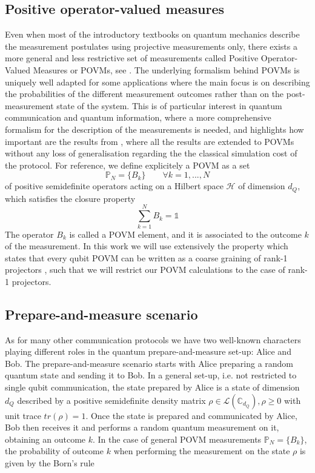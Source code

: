 \subsection{Positive operator-valued measures}\label{section:povms}
Even when most of the introductory textbooks on quantum mechanics describe the measurement postulates using projective measurements only, there exists a more general and less restrictive set of measurements called Positive Operator-Valued Measures or POVMs, see \cite{nielsen2000}\cite{peres1995}. The underlying formalism behind POVMs is uniquely well adapted for some applications where the main focus is on describing the probabilities of the different measurement outcomes rather than on the post-measurement state of the system. This is of particular interest in quantum communication and quantum information, where a more comprehensive formalism for the description of the measurements is needed, and highlights how important are the results from \cite{renner2023}, where all the results are extended to POVMs without any loss of generalisation regarding the the classical simulation cost of the protocol. For reference, we define explicitely a POVM as a set
\begin{equation}\label{eq:povm_!}
\mathbb{P}_N=\{B_{k}\}\qquad\forall k=1,...,N
\end{equation}
of positive semidefinite operators acting on a Hilbert space $\mathcal{H}$ of dimension $d_{Q}$, which satisfies the closure property
\begin{equation}\label{eq:povm_2}
\sum_{k=1}^{N} B_{k} = \mathbb{1}
\end{equation}
The operator $B_{k}$ is called a POVM element, and it is associated to the outcome $k$ of the measurement. In this work we will use extensively the property which states that every qubit POVM can be written as a coarse graining of rank-1 projectors \cite{barrett2002}, such that we will restrict our POVM calculations to the case of rank-1 projectors.

\subsection{Prepare-and-measure scenario}\label{section:pm}
As for many other communication protocols we have two well-known characters playing different roles in the quantum prepare-and-measure set-up: Alice and Bob. The prepare-and-measure scenario starts with Alice preparing a random quantum state and sending it to Bob. In a general set-up, i.e. not restricted to single qubit communication, the state prepared by Alice is a state of dimension $d_Q$ described by a positive semidefinite density matrix $\rho \in \mathcal{L}( \mathbb{C}_{d_Q}), \rho \ge 0$ with unit trace $tr(\rho)=1$. Once the state is prepared and communicated by Alice, Bob then receives it and performs a random quantum measurement on it, obtaining an outcome $k$. In the case of general POVM measurements $\mathbb{P}_N=\{B_{k}\}$, the probability of outcome $k$ when performing the measurement on the state $\rho$ is given by the Born's rule

